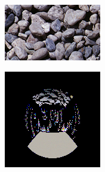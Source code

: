 \begin{figure}[]
\begin{subfigure}{\textwidth}
        \begin{subfigure}{0.19\textwidth}
            \centering
            \includegraphics[width=\textwidth]{images/04-experiment03/ball_pebble_target.jpg}
            \caption*{}
        \end{subfigure}
        \hfill
        \begin{subfigure}{0.19\textwidth}
            \centering
            \includegraphics[width=\textwidth]{images/04-experiment03/ball/pebbles/stats_im.jpg}
            \caption*{}
        \end{subfigure}
        \hfill
        \begin{subfigure}{0.19\textwidth}

\end{subfigure}
\end{subfigure}
\end{figure}
